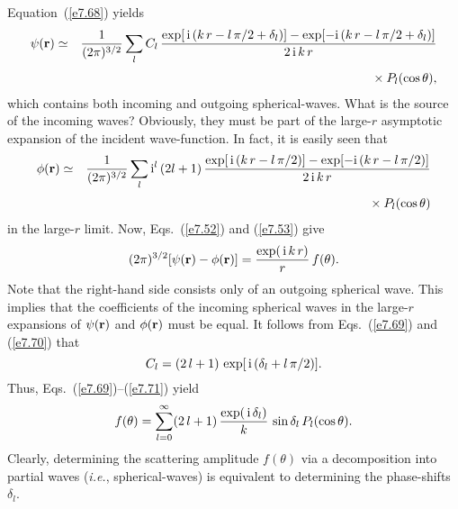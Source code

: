 Equation~(\ref{e7.68}) yields
\begin{eqnarray}
\psi({\bf r})& \simeq &\frac{1}{(2\pi)^{3/2}} \sum_l C_l\,
\frac{\exp[\,{\rm i}\,(k\,r - l\,\pi/2+ \delta_l)]
-\exp[-{\rm i}\,(k\,r - l\,\pi/2+ \delta_l)] }{2\,{\rm i}\,k\,r}\nonumber\\[0.5ex]
&&\mbox{\hspace{2cm}}\times  P_l(\cos\theta),\label{e7.69}
\end{eqnarray}
which contains both incoming and outgoing spherical-waves. What is the
source of the incoming waves? Obviously, they must be part of
the large-$r$ asymptotic expansion of the incident wave-function. In fact,
it is easily seen that
\begin{eqnarray}
\phi({\bf r}) &\simeq& \frac{1}{(2\pi)^{3/2}} \sum_l {\rm i}^l\,
(2l+1)\, \frac{
\exp[\,{\rm i}\,(k\,r - l\,\pi/2)]
-\exp[-{\rm i}\,(k\,r - l\,\pi/2)]}{2\,{\rm i}\,k\,r} \nonumber\\[0.5ex]
&&\mbox{\hspace{2cm}}\times P_l(\cos\theta)\label{e7.70}
\end{eqnarray}
in the large-$r$ limit. Now, Eqs.~(\ref{e7.52}) and (\ref{e7.53}) give
\begin{equation}\label{e7.71}
(2\pi)^{3/2}[\psi({\bf r} )- \phi({\bf r})  ] = 
\frac{\exp(\,{\rm i}\,k\,r)}{r}\,
f(\theta).
\end{equation}
Note that the right-hand side consists only of an outgoing spherical
wave. This implies that the coefficients of the incoming spherical waves
in the large-$r$  expansions of $\psi({\bf r})$ and $\phi({\bf r})$
must be equal. It follows from Eqs.~(\ref{e7.69}) and (\ref{e7.70}) that
\begin{equation}
C_l = (2\,l+1)\,\exp[\,{\rm i}\,(\delta_l + l\,\pi/2)].
\end{equation} 
Thus, Eqs.~(\ref{e7.69})--(\ref{e7.71}) yield
\begin{equation}\label{e7.73}
f(\theta) = \sum_{l=0}^\infty (2\,l+1)\,\frac{\exp(\,{\rm i}\,\delta_l)}
{k} \,\sin\delta_l\,P_l(\cos\theta).
\end{equation}
Clearly, determining the scattering amplitude
$f(\theta)$  via  a decomposition into
partial waves ({\em i.e.}, spherical-waves) is equivalent to determining
the phase-shifts $\delta_l$.

